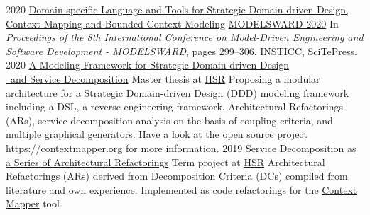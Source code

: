 \documentclass[]{cv-style}
\begin{document}
\begin{entrylist}
\entry
{2020}
{\href{https://doi.org/10.5220/0008910502990306}{Domain-specific Language and Tools for Strategic Domain-driven Design, \\ Context Mapping and Bounded Context Modeling}}
{\href{http://www.modelsward.org/?y=2020}{MODELSWARD 2020}}
{In \textit{Proceedings of the 8th International Conference on Model-Driven Engineering and Software Development - MODELSWARD}, pages 299–306. INSTICC, SciTePress.}
\entry
{2020}
{\href{https://eprints.hsr.ch/821/}{A Modeling Framework for Strategic Domain-driven Design \\\ and Service Decomposition}}
{Master thesis at \href{https://www.hsr.ch}{HSR}}
{Proposing a modular architecture for a Strategic Domain-driven Design (DDD) modeling framework including a DSL, a reverse engineering framework, Architectural Refactorings (ARs), service decomposition analysis on the basis of coupling criteria, and multiple graphical generators. Have a look at the open source project \\ \href{https://contextmapper.org}{https://contextmapper.org} for more information.}
\entry
{2019}
{\href{https://eprints.hsr.ch/784/}{Service Decomposition as a Series of Architectural Refactorings}}
{Term project at \href{https://www.hsr.ch}{HSR}}
{Architectural Refactorings (ARs) derived from Decomposition Criteria (DCs) compiled from literature and own experience. Implemented as code refactorings for the \href{https://contextmapper.org/}{Context Mapper} tool.}
\end{entrylist}
\end{document}
